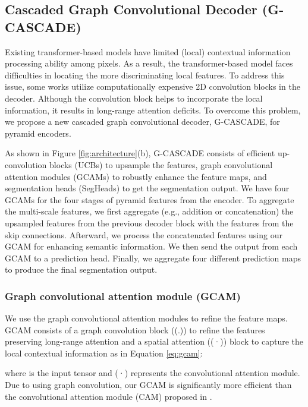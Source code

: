 \documentclass[10pt,twocolumn,letterpaper]{article}
\begin{document}
\subsection{Cascaded Graph Convolutional Decoder (G-CASCADE)}
Existing transformer-based models have limited (local) contextual information processing ability among pixels. As a result, the transformer-based model faces difficulties in locating the more discriminating local features. To address this issue, some works \cite{dong2021polyp,Rahman_2023_WACV, rahman2023multi} utilize computationally expensive 2D convolution blocks in the decoder. Although the convolution block helps to incorporate the local information, it results in long-range attention deficits. To overcome this problem, we propose a new cascaded graph convolutional decoder, G-CASCADE, for pyramid encoders.

As shown in Figure \ref{fig:architecture}(b), G-CASCADE consists of efficient up-convolution blocks (UCBs) to upsample the features, graph convolutional attention modules (GCAMs) to robustly enhance the feature maps, and segmentation heads (SegHeads) to get the segmentation output. We have four GCAMs for the four stages of pyramid features from the encoder. To aggregate the multi-scale features, we first aggregate (e.g., addition or concatenation) the upsampled features from the previous decoder block with the features from the skip connections. Afterward, we process the concatenated features using our GCAM for enhancing semantic information. We then send the output from each GCAM to a prediction head. Finally, we aggregate four different prediction maps to produce the final segmentation output.





\subsubsection{Graph convolutional attention module (GCAM)}
We use the graph convolutional attention modules to refine the feature maps. GCAM consists of a graph convolution block ((.)) to refine the features preserving long-range attention and a spatial attention \cite{chen2017sca} ((·)) block to capture the local contextual information as in Equation \ref{eq:gcam}:

where  is the input tensor and (·) represents the convolutional attention module. Due to using graph convolution, our GCAM is significantly more efficient than the convolutional attention module (CAM) proposed in \cite{Rahman_2023_WACV}.
\end{document}
